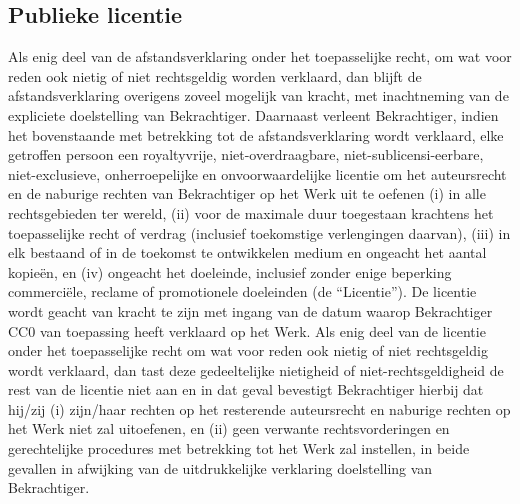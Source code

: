 \documentclass[10pt, a4paper]{article}
\begin{document}
\subsection{Publieke licentie}
Als enig deel van de afstandsverklaring onder het toepasselijke recht, om wat voor reden ook nietig of niet rechtsgeldig worden verklaard, dan blijft de afstandsverklaring overigens zoveel mogelijk van kracht, met inachtneming van de expliciete doelstelling van Bekrachtiger.
Daarnaast verleent Bekrachtiger, indien het bovenstaande met betrekking tot de afstandsverklaring wordt verklaard, elke getroffen persoon een royaltyvrije, niet-overdraagbare, niet-sublicensi-eerbare, niet-exclusieve, onherroepelijke en onvoorwaardelijke licentie om het auteursrecht en de naburige rechten van Bekrachtiger op het Werk uit te oefenen (i) in alle rechtsgebieden ter wereld, (ii) voor de maximale duur toegestaan krachtens het toepasselijke recht of verdrag (inclusief toekomstige verlengingen daarvan), (iii) in elk bestaand of in de toekomst te ontwikkelen medium en ongeacht het aantal kopieën, en (iv) ongeacht het doeleinde, inclusief zonder enige beperking commerciële, reclame of promotionele doeleinden (de ``Licentie''). De licentie wordt geacht van kracht te zijn met ingang van de datum waarop Bekrachtiger CC0 van toepassing heeft verklaard op het Werk.
Als enig deel van de licentie onder het toepasselijke recht om wat voor reden ook nietig of niet rechtsgeldig wordt verklaard, dan tast deze gedeeltelijke nietigheid of niet-rechtsgeldigheid de rest van de licentie niet aan en in dat geval bevestigt Bekrachtiger hierbij dat hij/zij (i) zijn/haar rechten op het resterende auteursrecht en naburige rechten op het Werk niet zal uitoefenen, en (ii) geen verwante rechtsvorderingen en gerechtelijke procedures met betrekking tot het Werk zal instellen, in beide gevallen in afwijking van de uitdrukkelijke verklaring doelstelling van Bekrachtiger.
\end{document}
